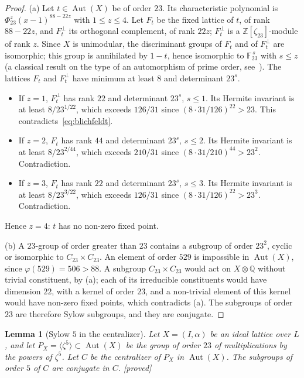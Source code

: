 \documentclass[11pt,a4paper]{amsart}
\theoremstyle{plain}
\newtheorem{lemma}[theorem]{Lemma}
\theoremstyle{definition}
\numberwithin{equation}{section}
\newcommand{\Q}{\mathbb{Q}}
\newcommand{\Z}{\mathbb{Z}}
\newcommand{\F}{\mathbb{F}}
\DeclareMathOperator{\Aut}{Aut}
\newcommand{\st}[1]{\textup{\textsf{\small[#1]}}}
\newcommand{\DEM}{\st{proved}}
\begin{document}
\begin{proof}
(a) Let $t\in\Aut(X)$ be of order $23$. Its characteristic polynomial is $\Phi_{23}^{z}(x-1)^{88-22z}$ with $1\le z\le4$. Let $F_t$ be the fixed lattice of $t$, of rank $88-22z$, and $F_t^\perp$ its orthogonal complement, of rank $22z$; $F_t^\perp$ is a $\Z[\zeta_{23}]$-module of rank $z$. Since $X$ is unimodular, the discriminant groups of $F_t$ and of $F_t^\perp$ are isomorphic; this group is annihilated by $1-t$, hence isomorphic to $\F_{23}^{\,s}$ with $s\le z$ (a classical result on the type of an automorphism of prime order, see~\cite{Neb13}). The lattices $F_t$ and $F_t^\perp$ have minimum at least $8$ and determinant $23^s$.
\begin{itemize}
\item If $z=1$, $F_t^\perp$ has rank $22$ and determinant $23^s$, $s\le1$. Its Hermite invariant is at least $8/23^{1/22}$, which exceeds $126/31$ since $(8\cdot31/126)^{22}>23$. This contradicts~\eqref{eq:blichfeldt}.
\item If $z=2$, $F_t$ has rank $44$ and determinant $23^s$, $s\le2$. Its Hermite invariant is at least $8/23^{2/44}$, which exceeds $210/31$ since $(8\cdot31/210)^{44}>23^2$. Contradiction.
\item If $z=3$, $F_t$ has rank $22$ and determinant $23^s$, $s\le3$. Its Hermite invariant is at least $8/23^{3/22}$, which exceeds $126/31$ since $(8\cdot31/126)^{22}>23^3$. Contradiction.
\end{itemize}
Hence $z=4$: $t$ has no non-zero fixed point.

(b) A $23$-group of order greater than $23$ contains a subgroup of order $23^2$, cyclic or isomorphic to $C_{23}\times C_{23}$. An element of order $529$ is impossible in $\Aut(X)$, since $\varphi(529)=506>88$. A subgroup $C_{23}\times C_{23}$ would act on $X\otimes\Q$ without trivial constituent, by (a); each of its irreducible constituents would have dimension $22$, with a kernel of order $23$, and a non-trivial element of this kernel would have non-zero fixed points, which contradicts (a). The subgroups of order $23$ are therefore Sylow subgroups, and they are conjugate.
\end{proof}

\begin{lemma}[Sylow $5$ in the centralizer]\label{lem:syl5}
Let $X=(I,\alpha)$ be an ideal lattice over $L$, and let $P_X=\langle\zeta^5\rangle\subset\Aut(X)$ be the group of order $23$ of multiplications by the powers of $\zeta^5$. Let $C$ be the centralizer of $P_X$ in $\Aut(X)$. The subgroups of order $5$ of $C$ are conjugate in $C$. \DEM
\end{lemma}
\end{document}
